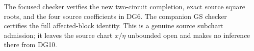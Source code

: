 The focused checker 
verifies the new two-circuit completion, exact source square roots,
and the four source coefficients in DG6. The companion GS checker
certifies the full affected-block identity. This is a genuine source
subchart admission; it leaves the source chart $x/\eta$ unbounded
open and makes no inference there from DG10.
